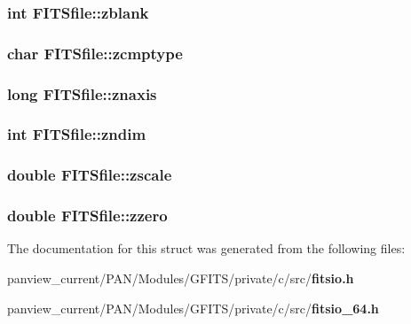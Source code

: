 \subsubsection{\setlength{\rightskip}{0pt plus 5cm}int \bf{FITSfile::zblank}}\label{structFITSfile_c8f64a2c9327505cd6c9d1dd37037fdd}


\subsubsection{\setlength{\rightskip}{0pt plus 5cm}char \bf{FITSfile::zcmptype}}\label{structFITSfile_91165bf81455a5e72b3d2e068c3e3a48}


\subsubsection{\setlength{\rightskip}{0pt plus 5cm}long \bf{FITSfile::znaxis}}\label{structFITSfile_8f3664a3d7cec9da977309272532a6ee}


\subsubsection{\setlength{\rightskip}{0pt plus 5cm}int \bf{FITSfile::zndim}}\label{structFITSfile_5ff648277ce3a2220a533ea37c2b785f}


\subsubsection{\setlength{\rightskip}{0pt plus 5cm}double \bf{FITSfile::zscale}}\label{structFITSfile_75b683d8db4f2acc96ed39e4249ca264}


\subsubsection{\setlength{\rightskip}{0pt plus 5cm}double \bf{FITSfile::zzero}}\label{structFITSfile_02930842674ceaf944372231964cd506}




The documentation for this struct was generated from the following files:\begin{CompactItemize}
\item 
panview\_\-current/PAN/Modules/GFITS/private/c/src/\bf{fitsio.h}\item 
panview\_\-current/PAN/Modules/GFITS/private/c/src/\bf{fitsio\_\-64.h}\end{CompactItemize}
